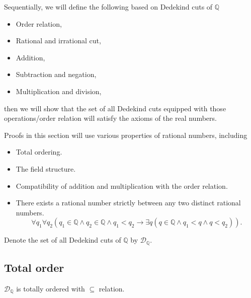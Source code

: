 Sequentially, we will define the following based on Dedekind cuts of $\mathbb{Q}$
\begin{itemize}[itemsep=0pt]
    \item Order relation,
    \item Rational and irrational cut,
    \item Addition,
    \item Subtraction and negation,
    \item Multiplication and division,
\end{itemize}

then we will show that the set of all Dedekind cuts equipped with those operations/order relation will satisfy the axioms of the real numbers.

Proofs in this section will use various properties of rational numbers, including
\begin{itemize}[itemsep=0pt]
    \item Total ordering.
    \item The field structure.
    \item Compatibility of addition and multiplication with the order relation.
    \item There exists a rational number strictly between any two distinct rational numbers.
          \[
              \forall q_{1}\forall q_{2}\left( q_{1}\in\mathbb{Q}\land q_{2}\in\mathbb{Q}\land q_{1} < q_{2} \rightarrow \exists q (q\in\mathbb{Q}\land q_{1} < q\land q < q_{2}) \right).
          \]
\end{itemize}

Denote the set of all Dedekind cuts of $\mathbb{Q}$ by $\mathscr{D}_{\mathbb{Q}}$.

\subsection{Total order}

\begin{theorem}
    $\mathscr{D}_{\mathbb{Q}}$ is totally ordered with $\subseteq$ relation.
\end{theorem}

